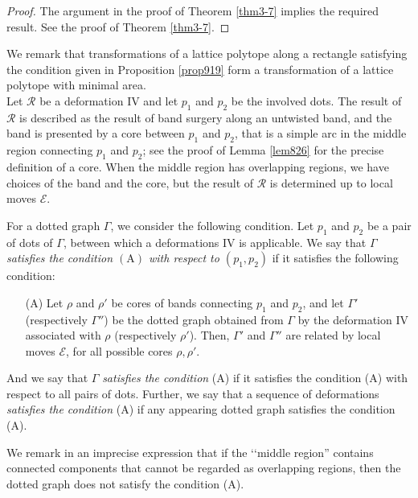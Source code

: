\documentclass[a4paper,11pt]{amsart}
\numberwithin{equation}{section}
\begin{document}
\begin{proof}
The argument in the proof of Theorem \ref{thm3-7} implies the required result. See the proof of Theorem \ref{thm3-7}. 
\end{proof}
 
We remark that transformations of a lattice polytope along a rectangle satisfying the condition given in Proposition \ref{prop919} form a transformation of a lattice polytope with minimal area.  \\


Let $\mathcal{R}$ be a deformation IV and let $p_1$ and $p_2$ be the involved dots. The result of $\mathcal{R}$ is described as the result of band surgery \cite{Kawauchi} along an untwisted band, and the band is presented by a core between $p_1$ and $p_2$, that is a simple arc in the middle region connecting $p_1$ and $p_2$; see the proof of Lemma \ref{lem826} for the precise definition of a core. When the middle region has overlapping regions, we have choices of the band and the core, but the result of $\mathcal{R}$ is determined up to local moves $\mathcal{E}$. 

For a dotted graph $\Gamma$, we consider the following condition. 
Let $p_1$ and $p_2$ be a pair of dots of $\Gamma$, between which a deformations IV is applicable. 
We say that $\Gamma$ {\it satisfies the condition $\mathrm{(A)}$ with respect to $(p_1, p_2)$} if it satisfies the following condition: 
\begin{enumerate}
\item[(A)]
Let $\rho$ and $\rho'$ be cores of bands connecting $p_1$ and $p_2$, 
and let $\Gamma'$ (respectively $\Gamma''$) be the dotted graph obtained from $\Gamma$ by the deformation IV associated with $\rho$ (respectively $\rho'$). 
Then, $\Gamma'$ and $\Gamma''$ are related by local moves $\mathcal{E}$, for all possible cores $\rho, \rho'$. 
\end{enumerate}

And we say that $\Gamma$ {\it satisfies the condition} (A) if it satisfies the condition (A) with respect to all pairs of dots. 
Further, we say that a sequence of deformations {\it satisfies the condition} (A) if any appearing dotted graph satisfies the condition (A). 

We remark in an imprecise expression that if the \lq\lq middle region'' contains connected components that cannot be regarded as overlapping regions, then the dotted graph does not satisfy the condition (A).  
 
\end{document}
